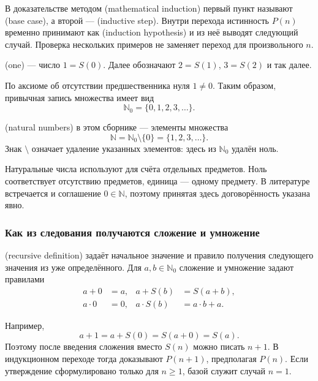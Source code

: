 В доказательстве методом  (mathematical induction)
первый пункт называют  (base case),
а второй ---  (inductive step).
Внутри перехода истинность \(P(n)\) временно принимают как
 (induction hypothesis) и из неё выводят следующий случай.
Проверка нескольких примеров не заменяет переход для произвольного \(n\).

\begin{definition}
 (one) --- число \(1=S(0)\).
Далее обозначают \(2=S(1)\), \(3=S(2)\) и так далее.
\end{definition}

По аксиоме об отсутствии предшественника нуля \(1\ne0\).
Таким образом, привычная запись множества имеет вид
\[
\mathbb N_0=\{0,1,2,3,\ldots\}.
\]

\begin{definition}
 (natural numbers) в этом сборнике --- элементы множества
\[
\mathbb N=\mathbb N_0\setminus\{0\}=\{1,2,3,\ldots\}.
\]
Знак \(\setminus\) означает удаление указанных элементов: здесь из \(\mathbb N_0\) удалён ноль.
\end{definition}

Натуральные числа используют для счёта отдельных предметов.
Ноль соответствует отсутствию предметов, единица --- одному предмету.
В литературе встречается и соглашение \(0\in\mathbb N\), поэтому принятая здесь договорённость указана явно.

\subsubsection*{Как из следования получаются сложение и умножение}

\begin{definition}
 (recursive definition) задаёт начальное значение
и правило получения следующего значения из уже определённого.
Для \(a,b\in\mathbb N_0\) сложение и умножение задают правилами
\[
\begin{aligned}
a+0&=a, & a+S(b)&=S(a+b),\\
a\cdot0&=0, & a\cdot S(b)&=a\cdot b+a.
\end{aligned}
\]
\end{definition}

Например,
\[
a+1=a+S(0)=S(a+0)=S(a).
\]
Поэтому после введения сложения вместо \(S(n)\) можно писать \(n+1\).
В индукционном переходе тогда доказывают \(P(n+1)\), предполагая \(P(n)\).
Если утверждение сформулировано только для \(n\ge1\), базой служит случай \(n=1\).

